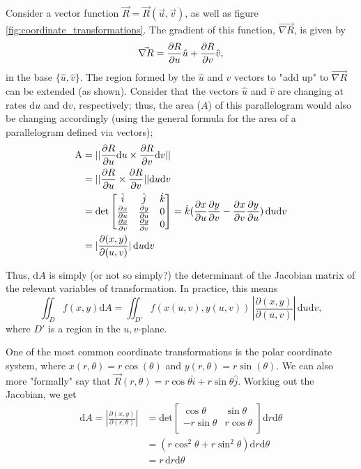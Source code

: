 \documentclass[12pt]{article}
\begin{document}
{Consider a vector function $\vec{R} = \vec{R}(\vec{u}, \vec{v})$, as well as figure \ref{fig:coordinate_transformations}. The gradient of this function, $\vec{\nabla R}$, is given by \[\vec{\nabla R} = \frac{\partial R}{\partial u} \hat{u} + \frac{\partial R}{\partial v} \hat{v},\] in the base $\{\hat{u}, \hat{v}\}$. The region formed by the $\hat{u}$ and $\hat{v}$ vectors to "add up" to $\vec{\nabla R}$ can be extended (as shown). Consider that the vectors $\hat{u}$ and $\hat{v}$ are changing at rates $\text{d}u$ and $\text{d}v$, respectively; thus, the area ($A$) of this parallelogram would also be changing accordingly (using the general formula for the area of a parallelogram defined via vectors); \begin{align*}
    \text{A} &= ||\frac{\partial R}{\partial u}\text{d}u  \times \frac{\partial R}{\partial v}\text{d}v||\\
    &=  ||\frac{\partial R}{\partial u} \times \frac{\partial R}{\partial v}||\text{d}u \text{d}v\\
    &= \text{det}\begin{bmatrix}
        \hat{i} & \hat{j} & \hat{k}\\
        \frac{\partial x}{\partial u} & \frac{\partial y}{\partial u} & 0\\
        \frac{\partial x}{\partial v} & \frac{\partial y}{\partial v} & 0\\
    \end{bmatrix}= \hat{k}(\frac{\partial x}{\partial u} \frac{\partial y}{\partial v} - \frac{\partial x}{\partial v} \frac{\partial y}{\partial u})\,\text{d}u \text{d}v\\
    &= |\frac{\partial(x,y)}{\partial(u,v)}|\,\text{d}u \text{d}v
\end{align*}

Thus, $\text{d}A$ is simply (or not so simply?) the determinant of the Jacobian matrix of the relevant variables of transformation. In practice, this means \[\iint_D f(x,y) \text{d}A = \iint_{D'} f(x(u,v), y(u,v))\, |\frac{\partial(x,y)}{\partial(u,v)}|\,\text{d}u \text{d}v,\] where $D'$ is a region in the $u,v$-plane.

One of the most common coordinate transformations is the polar coordinate system, where $x(r,\theta) = r \cos (\theta)$ and $y(r, \theta) = r \sin(\theta)$. We can also more "formally" say that $\vec{R}(r, \theta) = r \cos \theta \hat{i} + r \sin \theta \hat{j}$. Working out the Jacobian, we get \begin{align*}
    \text{d}A = |\frac{\partial(x,y)}{\partial(r,\theta)}| &= \text{det}\begin{bmatrix}
       \cos \theta & \sin \theta\\
        -r \sin \theta & r \cos \theta\\
    \end{bmatrix} \text{d}r \text{d}\theta\\
    &=  (r\cos^2 \theta + r \sin^2 \theta) \text{d}r \text{d}\theta \\
    &= r\,\text{d}r \text{d}\theta
\end{align*}

}
\end{document}
